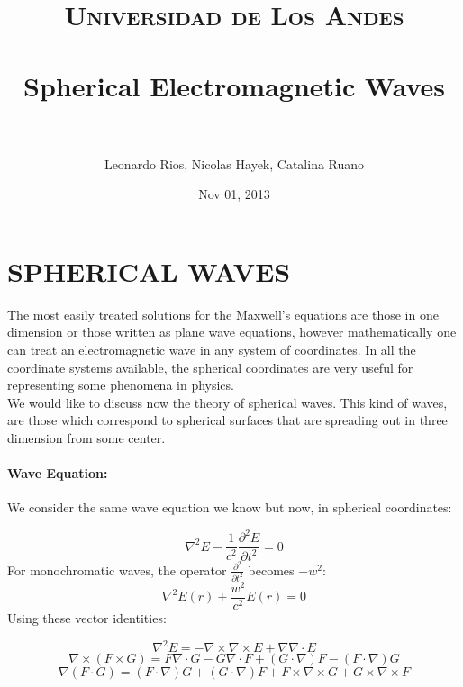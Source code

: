 \documentclass[paper=a4, fontsize=11pt]{scrartcl} %
\title{        
\normalfont \normalsize
\textsc{Universidad de Los Andes} \\ [25pt] %
\horrule{0.5pt} \\[0.4cm] %
\huge Spherical Electromagnetic Waves \\ %
\horrule{2pt} \\[0.5cm] %
}
\author{Leonardo Rios, Nicolas Hayek, Catalina Ruano} %
\date{\normalsize{Nov 01, 2013}} %
\numberwithin{equation}{section} %
\numberwithin{figure}{section} %
\numberwithin{table}{section} %
\begin{document}
\maketitle %



\section*{SPHERICAL WAVES}

The most easily treated solutions for the Maxwell's equations are those in one dimension or those written as plane wave equations, 
however mathematically one can treat an electromagnetic wave in any system of coordinates. 
In all the coordinate systems available, the spherical coordinates are very useful for representing some phenomena in physics.\\
We would like to discuss now the theory of spherical waves. This kind of waves, are those which correspond to spherical surfaces that are 
spreading out in three dimension from some center.

\paragraph*{Wave Equation:}
We consider the same wave equation we know but now, in spherical coordinates:

\begin{equation}
\nabla^2 E-\frac{1}{c^2}\frac{\partial^2 E}{\partial t^2} =0
\end{equation}
For monochromatic waves, the operator $\frac{\partial^2 }{\partial t^2}$ becomes $-w^2$: \\
\begin{equation}
\nabla^2 E(r)+\frac{w^2}{c^2}E(r) =0 \label{eq2}
\end{equation}
Using these vector identities:

\begin{equation}
\nabla^2 E=-\nabla \times \nabla \times E + \nabla\nabla \cdot E
\end{equation}
\begin{equation}
\nabla \times (F \times G)=F\nabla\cdot G -G \nabla \cdot F + (G\cdot\nabla)F - (F\cdot\nabla)G
\end{equation}
\begin{equation}
\nabla(F\cdot G)=(F \cdot \nabla)G + (G \cdot \nabla)F+ F\times \nabla \times G + G \times \nabla \times F
\end{equation}
\end{document}
